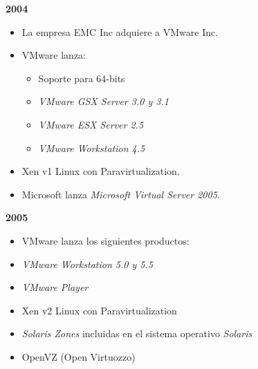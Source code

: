 \textbf{2004}
\begin{itemize}
	\item La empresa EMC Inc adquiere a VMware Inc.\\
	
	\item VMware lanza: \\
	\begin{itemize}
		\item Soporte para 64-bits\\ 
		\item \textit{VMware GSX Server 3.0 y 3.1}\\
		\item \textit{VMware ESX Server 2.5}\\
		\item \textit{VMware Workstation 4.5}\\
		
		
	\end{itemize}

	\item Xen v1 Linux con Paravirtualization. \\
	\item Microsoft lanza \textit{Microsoft Virtual Server 2005}. \\
	
\end{itemize}

\textbf{2005}
\begin{itemize}
	\item VMware lanza los siguientes productos: \\
	
	\item \textit{VMware Workstation 5.0 y 5.5}\\
	
	\item \textit{VMware Player}\\
	
	\item Xen v2 Linux con Paravirtualization\\
	
	\item \textit{Solaris Zones} incluidas en el sistema operativo \textit{Solaris}\\
	
	\item OpenVZ (Open Virtuozzo)\\
\end{itemize}

